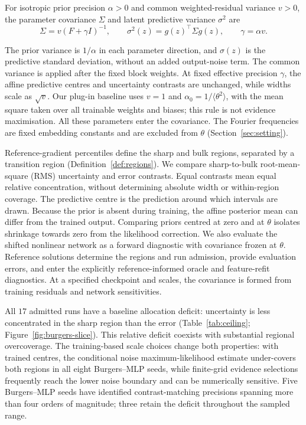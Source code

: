 \begin{samepage}
For isotropic prior precision $\alpha>0$ and common
weighted-residual variance $v>0$, the parameter covariance $\Sigma$ and latent
predictive variance $\sigma^2$ are
\begin{equation*}
 \Sigma=v(F+\gamma I)^{-1},\qquad
 \sigma^2(z)=g(z)^\top\Sigma g(z),\qquad \gamma=\alpha v.
\end{equation*}
\end{samepage}
The prior variance is $1/\alpha$ in each parameter direction, and $\sigma(z)$ is
the predictive standard deviation, without an added output-noise term. The common
variance is applied after the fixed block weights. At fixed effective
precision $\gamma$, the affine predictive centres and uncertainty contrasts are
unchanged, while widths scale as $\sqrt v$. Our plug-in baseline uses $v=1$ and
$\alpha_0=1/\langle\theta^2\rangle$, with the mean square taken over all trainable
weights and biases; this rule is not evidence maximisation. All these parameters
enter the covariance. The Fourier frequencies are fixed embedding constants and
are excluded from $\theta$ (Section~\ref{sec:setting}).

Reference-gradient percentiles define the sharp and bulk regions, separated by
a transition region (Definition~\ref{def:regions}). We compare sharp-to-bulk
root-mean-square (RMS) uncertainty and error contrasts. Equal contrasts mean equal
relative concentration, without determining absolute width or within-region
coverage. The predictive centre is the prediction around which intervals are
drawn. Because the prior is absent during training, the affine posterior mean
can differ from the trained output. Comparing priors centred at zero and at
$\theta$ isolates shrinkage towards zero from the likelihood correction. We also
evaluate the shifted nonlinear network as a forward diagnostic with covariance
frozen at $\theta$. Reference solutions determine the regions and run admission,
provide evaluation errors, and enter the explicitly reference-informed oracle and feature-refit
diagnostics. At a specified checkpoint and scales, the covariance is formed from
training residuals and network sensitivities.

All $17$ admitted runs have a baseline allocation deficit: uncertainty is less
concentrated in the sharp region than the error (Table~\ref{tab:ceiling};
Figure~\ref{fig:burgers-slice}). This relative deficit coexists with substantial
regional overcoverage. The training-based scale choices change both properties:
with trained centres, the conditional noise maximum-likelihood estimate
under-covers both regions in all eight Burgers--MLP seeds, while finite-grid
evidence selections frequently
reach the lower noise boundary and can be numerically sensitive. Five
Burgers--MLP seeds have identified contrast-matching precisions spanning more
than four orders of magnitude; three retain the deficit throughout the sampled
range.

